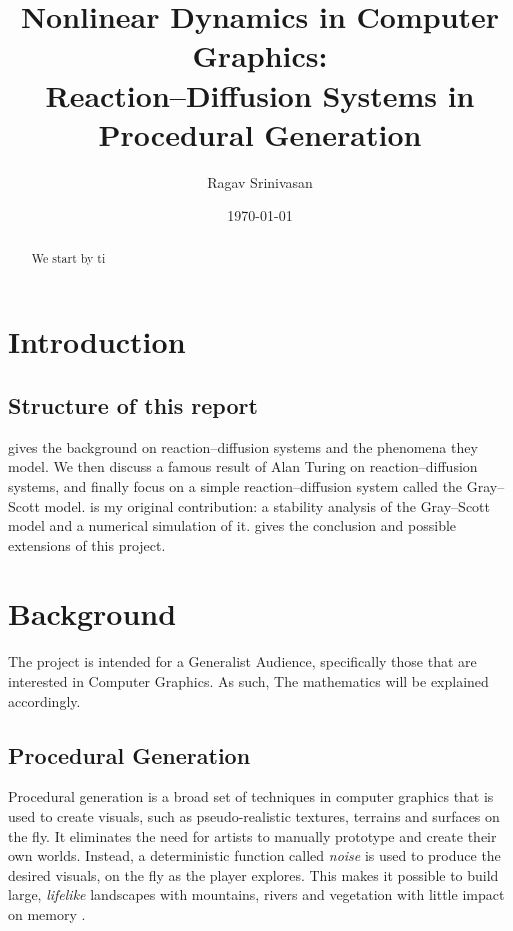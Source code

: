 \documentclass[a4paper, 11pt]{article}
\title{Nonlinear Dynamics in Computer Graphics:\\
       Reaction--Diffusion Systems in Procedural Generation}
\author{Ragav Srinivasan}
\date{\today}
\begin{document}
\maketitle

\begin{abstract}
	We start by ti
\end{abstract}

\section{Introduction}
\label{sec:introduction}




\subsection{Structure of this report}
 gives the background on reaction--diffusion systems and the phenomena they
model. We then discuss a famous result of Alan Turing on reaction--diffusion systems, and finally
focus on a simple reaction--diffusion system called the Gray--Scott model.
 is my original contribution: a stability analysis of the Gray--Scott model
and a numerical simulation of it.
 gives the conclusion and possible extensions of this project.
\section{Background}
\label{sec:background}

The project is intended for a Generalist Audience, specifically those that are interested in Computer Graphics. As such, The mathematics will be explained accordingly.  

\subsection{Procedural Generation}
\label{sec:procedural}

Procedural generation is a broad set of techniques in computer graphics that is used to create visuals, such as pseudo-realistic textures, terrains and surfaces on the fly. It eliminates the need for artists to manually prototype and create their own worlds. Instead, a deterministic function called \emph{noise} is used to produce the desired visuals, on the fly as the player explores. This makes it possible to build large, \emph{lifelike} landscapes with mountains, rivers and vegetation with little impact on memory \parencite{lagae2010}.
\end{document}
